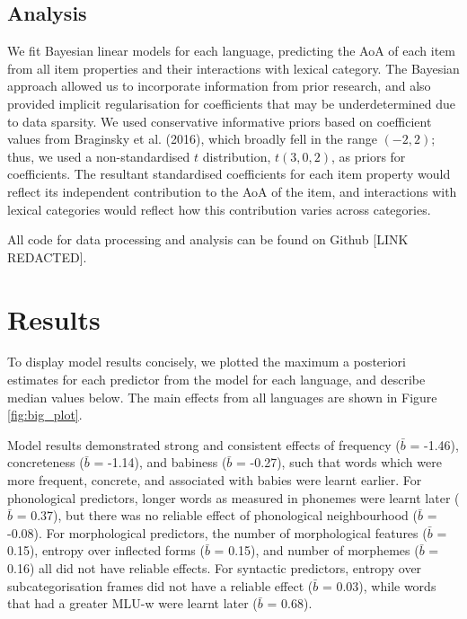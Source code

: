 \documentclass[10pt, letterpaper]{article}
\begin{document}
\hypertarget{analysis}{%
\subsection{Analysis}\label{analysis}}

We fit Bayesian linear models for each language, predicting the AoA of
each item from all item properties and their interactions with lexical
category. The Bayesian approach allowed us to incorporate information
from prior research, and also provided implicit regularisation for
coefficients that may be underdetermined due to data sparsity. We used
conservative informative priors based on coefficient values from
Braginsky et al. (2016), which broadly fell in the range \((-2, 2)\);
thus, we used a non-standardised \(t\) distribution, \(t(3, 0, 2)\), as
priors for coefficients. The resultant standardised coefficients for
each item property would reflect its independent contribution to the AoA
of the item, and interactions with lexical categories would reflect how
this contribution varies across categories.

All code for data processing and analysis can be found on Github {[}LINK
REDACTED{]}.

\hypertarget{results}{%
\section{Results}\label{results}}

To display model results concisely, we plotted the maximum a posteriori
estimates for each predictor from the model for each language, and
describe median values below. The main effects from all languages are
shown in Figure \ref{fig:big_plot}.

Model results demonstrated strong and consistent effects of frequency
(\(\bar{b}\) = -1.46), concreteness (\(\bar{b}\) = -1.14), and babiness
(\(\bar{b}\) = -0.27), such that words which were more frequent,
concrete, and associated with babies were learnt earlier. For
phonological predictors, longer words as measured in phonemes were
learnt later (\(\bar{b}\) = 0.37), but there was no reliable effect of
phonological neighbourhood (\(\bar{b}\) = -0.08). For morphological
predictors, the number of morphological features (\(\bar{b}\) = 0.15),
entropy over inflected forms (\(\bar{b}\) = 0.15), and number of
morphemes (\(\bar{b}\) = 0.16) all did not have reliable effects. For
syntactic predictors, entropy over subcategorisation frames did not have
a reliable effect (\(\bar{b}\) = 0.03), while words that had a greater
MLU-w were learnt later (\(\bar{b}\) = 0.68).
\end{document}
